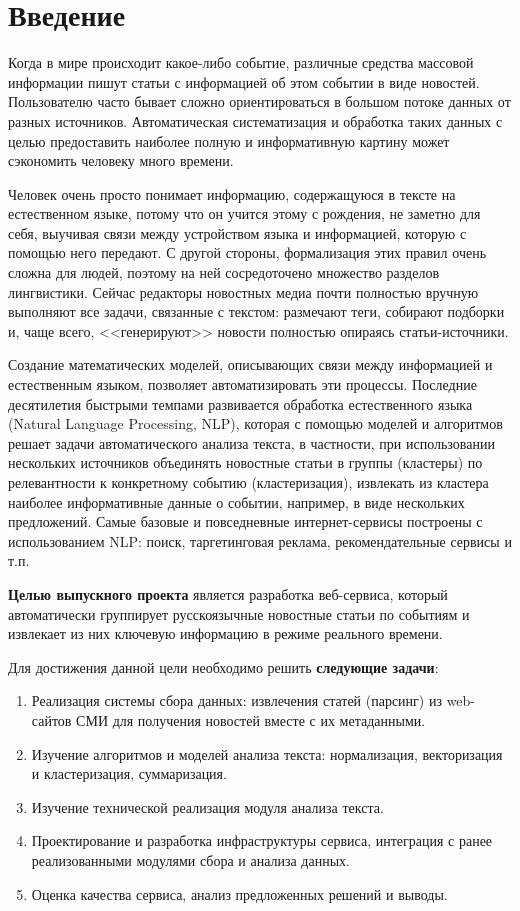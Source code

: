 \documentclass[a4paper, 14pt]{extarticle}
\begin{document}
\tableofcontents %
\clearpage

\section{Введение}


Когда в мире происходит какое-либо событие, различные средства массовой информации
пишут статьи с информацией об этом событии в виде новостей. Пользователю часто бывает сложно ориентироваться в большом потоке данных от разных источников. Автоматическая систематизация и обработка таких данных с целью предоставить наиболее полную и информативную картину может сэкономить человеку много времени. 

Человек очень просто понимает информацию, содержащуюся в тексте на естественном языке, потому что он учится этому с рождения, не заметно для себя, выучивая связи между устройством языка и информацией, которую с помощью него передают. С другой стороны, формализация этих правил очень сложна для людей, поэтому на ней сосредоточено множество разделов лингвистики. Сейчас редакторы новостных медиа почти полностью вручную выполняют все задачи, связанные с текстом: размечают теги, собирают подборки и, чаще всего, <<генерируют>> новости полностью опираясь статьи-источники.

Создание математических моделей, описывающих связи между информацией и естественным языком, позволяет автоматизировать эти процессы. Последние десятилетия быстрыми темпами развивается обработка естественного языка (Natural Language Processing, NLP), которая с помощью моделей и алгоритмов решает задачи автоматического анализа текста, в частности, при использовании нескольких источников объединять новостные статьи в группы (кластеры) по релевантности к конкретному событию (кластеризация), извлекать из кластера наиболее информативные данные о событии, например, в виде нескольких предложений. Самые базовые и повседневные интернет-сервисы построены с использованием NLP: поиск, таргетинговая реклама, рекомендательные сервисы и т.п.

{\bf Целью выпускного проекта} является разработка веб-сервиса, который автоматически
группирует русскоязычные новостные статьи по событиям и извлекает из них ключевую информацию в режиме реального времени. 

Для достижения данной цели необходимо решить {\bf следующие задачи}:
\begin{enumerate}
	\item Реализация системы сбора данных: извлечения статей (парсинг) из web-сайтов СМИ для получения новостей вместе с их метаданными.
	\item Изучение алгоритмов и моделей анализа текста: нормализация, векторизация и кластеризация, суммаризация.
	\item Изучение технической реализация модуля анализа текста.
	\item Проектирование и разработка инфраструктуры сервиса, интеграция с ранее реализованными модулями сбора и анализа данных.
	\item Оценка качества сервиса, анализ предложенных решений и выводы.
\end{enumerate}
\end{document}
